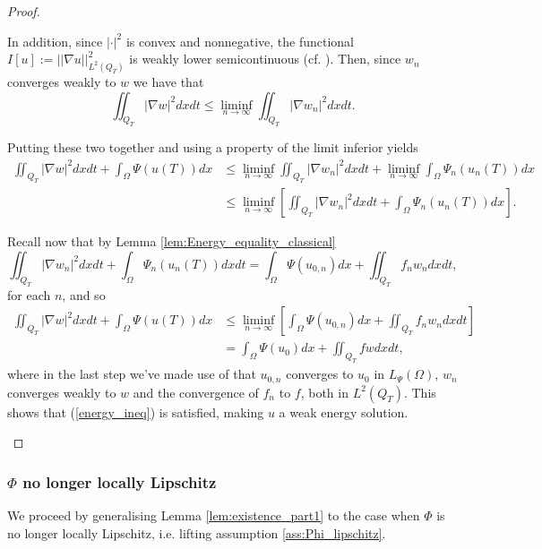 \documentclass[11pt, a4paper]{article}
\begin{document}
\begin{proof}
\begin{description}
	In addition, since $|\cdot|^2$ is convex and nonnegative, the functional $I[u]:= ||\nabla u||^2_{L^2(Q_T)}$ is weakly lower semicontinuous (cf. \citep[Theorem 1, p. 468]{evans}). Then, since $w_n$ converges weakly to $w$ we have that
	\begin{equation}
	\iint_{Q_T}|\nabla w|^2 dxdt \leq \liminf_{n \to \infty} \iint_{Q_T} |\nabla w_n|^2 dxdt.
	\end{equation}
	
	Putting these two together and using a property of the limit inferior yields
	\begin{align*}
	\iint_{Q_T}|\nabla w|^2dxdt + \int_\Omega \Psi(u(T))dx &\leq \liminf_{n \to \infty} \iint_{Q_T} |\nabla w_n|^2 dxdt + \liminf_{n \to \infty} \int_\Omega \Psi_n(u_n(T))dx \\
	&\leq \liminf_{n \to \infty} \left[ \iint_{Q_T} |\nabla w_n|^2 dxdt + \int_\Omega \Psi_n(u_n(T))dx \right].
	\end{align*}
	
	Recall now that by Lemma \ref{lem:Energy_equality_classical} 
	\begin{equation*}
	\iint_{Q_T} |\nabla w_n|^2 dxdt + \int_\Omega \Psi_n(u_n(T))dxdt = \int_\Omega \Psi(u_{0,n})dx + \iint_{Q_T}f_n w_n dxdt,
	\end{equation*}
	for each $n$, and so
	\begin{align*}
	\iint_{Q_T}|\nabla w|^2dxdt + \int_\Omega \Psi(u(T))dx &\leq \liminf_{n \to \infty} \left[\int_\Omega \Psi(u_{0,n})dx + \iint_{Q_T}f_n w_n dxdt \right] \\
	&= \int_\Omega \Psi(u_0)dx + \iint_{Q_T} f w dxdt,
	\end{align*}
	where in the last step we've made use of that $u_{0,n}$ converges to $u_0$ in $L_{\Psi}(\Omega)$, $w_n$ converges weakly to $w$ and the convergence of $f_n$ to $f$, both in $L^2(Q_T)$. This shows that (\ref{energy_ineq}) is satisfied, making $u$ a weak energy solution.
\end{description}

\end{proof}



\subsubsection{$\Phi$ no longer locally Lipschitz}
We proceed by generalising Lemma \ref{lem:existence_part1} to the case when $\Phi$ is no longer locally Lipschitz, i.e. lifting assumption \ref{ass:Phi_lipschitz}.
\end{document}
